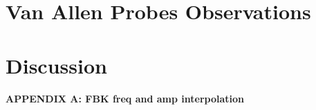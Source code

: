 \documentclass[jgrga]{agutex}
\begin{document}
\begin{article}
\lipsum[11-13]


\section{Van Allen Probes Observations}

\lipsum[14-16]


\section{Discussion}

\lipsum[17-19]





\end{article}


\begin{appendix}
    \label{app}

\begin{center}
    {\bf APPENDIX A: FBK freq and amp interpolation}
\end{center}

\lipsum[20]

\end{appendix}


\begin{acknowledgments}

\lipsum[21]

\end{acknowledgments}

\clearpage
\end{document}
